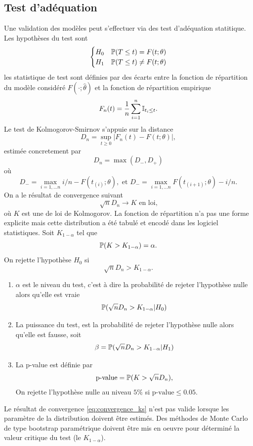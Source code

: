\subsection{Test d'adéquation}
Une validation des modèles peut s'effectuer via des test d'adéquation statitique. Les hypothèses du test sont 
$$
\begin{cases}
H_0&\mathbb{P}(T\leq t)  = F(t; \theta)\\
H_1&\mathbb{P}(T\leq t)  \neq F(t; \theta)
\end{cases}
$$
les statistique de test sont définies par des écarts entre la fonction de répartition du modèle considéré $F(\cdot ; \hat{\theta})$ et la fonction de répartition empirique 
$$
F_n(t) = \frac{1}{n}\sum_{i=1}^n\mathbb{I}_{t_i\leq t}.
$$
Le test de Kolmogorov-Smirnov s'appuie sur la distance 
$$
D_n = \underset{t\geq 0}{\sup}|F_n(t) - F(t; \theta)|,
$$
estimée concretement par 
$$
D_n=\max(D_-,D_+)
$$
où
$$
D_- =\underset{i = 1,\ldots n}{\max} i/n -F\left(t_{(i)}; \theta\right),\text{ et }D_- =\underset{i = 1,\ldots n}{\max} F\left(t_{(i+1)}; \theta\right) - i/n.
$$ 
On a le résultat de convergence suivant 
\begin{equation}\label{eq:convergence_ks}
\sqrt{n}D_n\overset{}{\rightarrow} K\text{ en loi,}
\end{equation}
où $K$ est une \va de loi de Kolmogorov. La fonction de répartition n'a pas une forme explicite mais cette distribution a été tabulé et encodé dans les logiciel statistiques. Soit $K_{1-\alpha}$ tel que 
$$
\mathbb{P}(K>K_{1-\alpha}) = \alpha.
$$ 
On rejette l'hypothèse $H_0$ si 
$$
\sqrt{n}D_n >K_{1-\alpha}.
$$
\begin{definition}
\begin{enumerate}
	\item $\alpha$ est le niveau du test, c'est à dire la probabilité de rejeter l'hypothèse nulle alors qu'elle est vraie
	$$
	\mathbb{P}(\sqrt{n}D_n>K_{1-\alpha}|H_0)
	$$
	\item La puissance du test, est la probabilité de rejeter l'hypothèse nulle alors qu'elle est fausse, soit 
	$$
	\beta = \mathbb{P}(\sqrt{n}D_n >  K_{1-\alpha}|H_1)
	$$
	\item La p-value est définie par  
	$$
	\text{p-value} = \mathbb{P}(K > \sqrt{n}D_n),
	$$
	On rejette l'hypothèse nulle au niveau $5\%$ si $\text{p-value} \leq 0.05$.
\end{enumerate}
\end{definition}
\begin{remark}
Le résultat de convergence \eqref{eq:convergence_ks} n'est pas valide lorsque les paramètre de la distribution doivent être estimés. Des méthodes de Monte Carlo de type bootstrap paramétrique doivent être mis en oeuvre pour déterminé la valeur critique du test (le $K_{1-\alpha}$).
\end{remark}





